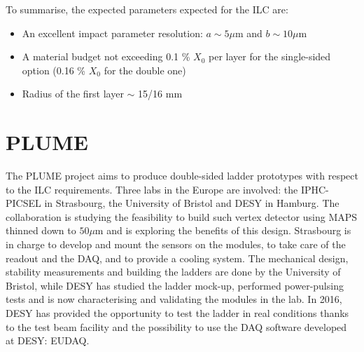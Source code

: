   
   
   


   To summarise, the expected parameters expected for the \gls{ILC} are: 
   \begin{itemize}
     \item An excellent impact parameter resolution: $ a \sim 5 \mu\text{m}$ and $b \sim 10 \mu\text{m}$
     \item A material budget not exceeding 0.1 \% $X_0$ per layer for the single-sided option (0.16 \% $X_0$ for the double one)
     \item Radius of the first layer $\sim$ 15/16 mm
   \end{itemize}

  \section{PLUME}

  The \acrfull{PLUME} project aims to produce double-sided ladder prototypes with respect to the \gls{ILC} requirements\cite{PLUME}.
  Three labs in the Europe are involved: the IPHC-PICSEL in Strasbourg, the University of Bristol and DESY in Hamburg.
  The collaboration is studying the feasibility to build such vertex detector using \gls{MAPS} thinned down to $50 \mu\text{m}$ and is exploring the benefits of this design.
  Strasbourg is in charge to develop and mount the sensors on the modules, to take care of the readout and the \gls{DAQ}, and to provide a cooling system.
  The mechanical design, stability measurements and building the ladders are done by the University of Bristol, while DESY has studied the ladder mock-up, performed power-pulsing tests and is now characterising and validating the modules in the lab.
  In 2016, DESY has provided the opportunity to test the ladder in real conditions thanks to the test beam facility and the possibility to use the \gls{DAQ} software developed at DESY: EUDAQ.

